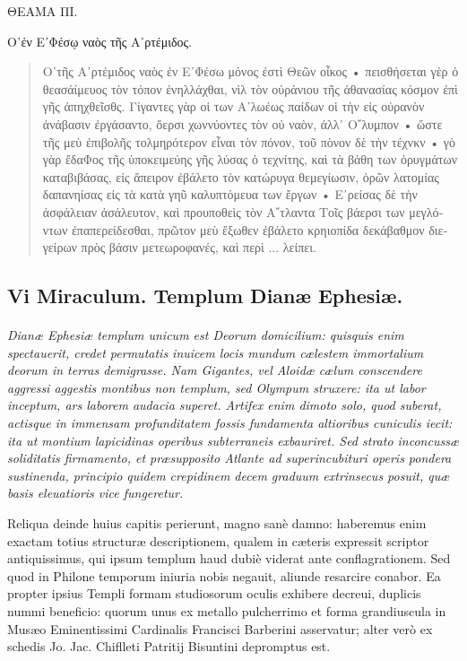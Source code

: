 \documentclass[a4paper, 11pt, oneside, polutonikogreek, latin]{article}
\begin{document}
\clearpage
\begin{center}
\foreignlanguage{greek}{
ΘΕΑΜΑ ΠΙ.
}
\end{center}
\begin{center}
\foreignlanguage{greek}{
Ο῾ἐν Ε᾽Φέσῳ ναὸς τῆς Α᾽ρτέμιδος.
}
\end{center}
\begin{quote}
\foreignlanguage{greek}{
Ο῾τῆς Α᾽ρτέμιδος ναὸς ἐν Ε᾽Φέσω μόνος ἐστὶ Θεῶν οἶκος • πεισθήσεται γὲρ ὁ θεασάίμευος τὸν τόπον ἐνηλλάχθαι, νὶλ τὸν οὐράνιου τῆς ἀθανασίας κόσμον ἐπὶ γῆς ἀπηχθεῖσθς. Γίγαντες γὰρ οἱ των Α᾽λωέως παίδων οἱ τὴν εἰς οὐρανὸν ἀνάβασιν ἐργάσαντο, ὄερσι χωννύοντες τὸν οὐ ναὸν, ἀλλ᾽ Ο῎λυμπον • ὥστε τῆς μεὺ ἐπιβολῆς τολμηρότερον εἶναι τὸν πόνον, τοῦ πὸνον δὲ τὴν τέχνκν • γὸ γὰρ ἔδαΦος τῆς ὑποκειμεύης γῆς λύσας ὁ τεχνίτης, καὶ τὰ βάθη των ὀρυγμάτων καταβιβάσας, εἰς ἄπειρον ἐβάλετο τὸν κατώρυγα θεμεγίωσιν, ὀρῶν λατομίας δαπανηίσας εἰς τὰ κατὰ γηῦ καλυπτόμευα των ἔργων • Ε᾽ρείσας δὲ τὴν ἀσφάλειαν ἀσάλευτον, καὶ προυποθεὶς τὸν Α῎τλαντα Τοῖς βάερσι των μεγλόντων ἐπαπερείδεσθαι, πρῶτον μεὺ ἔξωθεν ἐβάλετο κρηιοπίδα δεκάβαθμον διεγείρων πρὸς βάσιν μετεωροφανές, καὶ περὶ ... λείπει.
}
\end{quote}
\clearpage
\subsection{Vi Miraculum. Templum Dianæ Ephesiæ.}
\paragraph{}
\emph{Dianæ Ephesiæ templum unicum est Deorum domicilium: quisquis enim spectauerit, credet permutatis inuicem locis mundum cælestem immortalium deorum in terras demigrasse. Nam Gigantes, vel Aloidæ cælum conscendere aggressi aggestis montibus non templum, sed Olympum struxere: ita ut labor inceptum, ars laborem audacia superet. Artifex enim dimoto solo, quod suberat, actisque in immensam profunditatem fossis fundamenta altioribus cuniculis iecit: ita ut montium lapicidinas operibus subterraneis exbauriret. Sed strato inconcussæ soliditatis firmamento, et præsupposito Atlante ad superincubituri operis pondera sustinenda, principio quidem crepidinem decem graduum extrinsecus posuit, quæ basis eleuatioris vice fungeretur.}

Reliqua deinde huius capitis perierunt, magno sanè damno: haberemus enim exactam totius structuræ descriptionem, qualem in cæteris expressit scriptor antiquissimus, qui ipsum templum haud dubiè viderat ante conflagrationem. Sed quod in Philone temporum iniuria nobis negauit, aliunde resarcire conabor. Ea propter ipsius Templi formam studiosorum oculis exhibere decreui, duplicis nummi beneficio: quorum unus ex metallo pulcherrimo et forma grandiuscula in Musæo Eminentissimi Cardinalis Francisci Barberini asservatur; alter verò ex schedis Jo. Jac. Chiflleti Patritij Bisuntini depromptus est.
\end{document}
